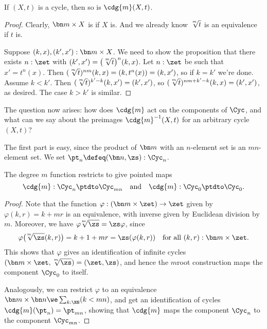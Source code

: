 \begin{lemma}
  If $(X,t)$ is a cycle, then so is $\cdg{m}(X,t)$.
\end{lemma}
\begin{proof}
  Clearly, $\bn m\times X$ is \nonempty if $X$ is.
  And we already know $\sqrt[\uproot{2}m]{t}$ is an equivalence if $t$ is.

  Suppose $(k,x),(k',x'):\bn m\times X$.
  We need to show the proposition that there exists $n:\zet$
  with $(k',x') = \bigl(\sqrt[\uproot{2}m]t\bigr)^n(k,x)$.
  Let $n:\zet$ be such that $x' = t^n(x)$.
  Then $(\sqrt[\uproot{2}m]t)^{nm}(k,x) = (k,t^n(x)) = (k,x')$,
  so if $k=k'$ we're done.
  Assume $k<k'$. Then $(\sqrt[\uproot{2}m]t)^{k'-k}(k,x') = (k',x')$,
  so $(\sqrt[\uproot{2}m]t)^{nm+k'-k}(k,x) = (k',x')$, as desired.
  The case $k>k'$ is similar.
\end{proof}

The question now arises: how does $\cdg{m}$ act on the components of $\Cyc$,
and what can we say about the preimages $\cdg{m}^{-1}(X,t)$
for an arbitrary cycle $(X,t)$?

The first part is easy, since the product of $\bn m$ with an $n$-element set
is an $mn$-element set. We set $\pt_n \defeq (\bn n,\zs) : \Cyc_n$.
\begin{lemma}
  The degree $m$ function restricts to give pointed maps
  \[
    \cdg{m} : \Cyc_n \ptdto \Cyc_{mn} \quad\text{and}\quad
    \cdg{m} : \Cyc_0 \ptdto \Cyc_0.
  \]
\end{lemma}
\begin{proof}
  Note
  that the function $\varphi : (\bn m\times \zet) \to \zet$
  given by $\varphi(k,r)=k+mr$ is an equivalence,
  with inverse given by Euclidean division by $m$.
  Moreover, we have ${\varphi\!\sqrt[\uproot{2}m]\zs} = {\zs\varphi}$, since
  \[
    \varphi\bigl(\!\sqrt[\uproot{2}m]\zs(k,r)\bigr)
    = k+1+mr = \zs(\varphi(k,r))
    \quad\text{for all $(k,r):\bn m\times \zet$}.
  \]
  This shows that $\varphi$ gives an identification of infinite cycles
  $(\bn m\times\zet, \sqrt[\uproot{2}m]\zs) = (\zet,\zs)$,
  and hence the $m$\th root construction maps the component $\Cyc_0$ to itself.

  Analogously, we can restrict $\varphi$ to
  an equivalence $\bn m \times \bn n \we \sum_{k:\NN}(k<mn)$,
  and get an identification of cycles $\cdg{m}(\pt_n) = \pt_{mn}$,
  showing that $\cdg{m}$ maps the component $\Cyc_n$ to the component $\Cyc_{mn}$.
\end{proof}


